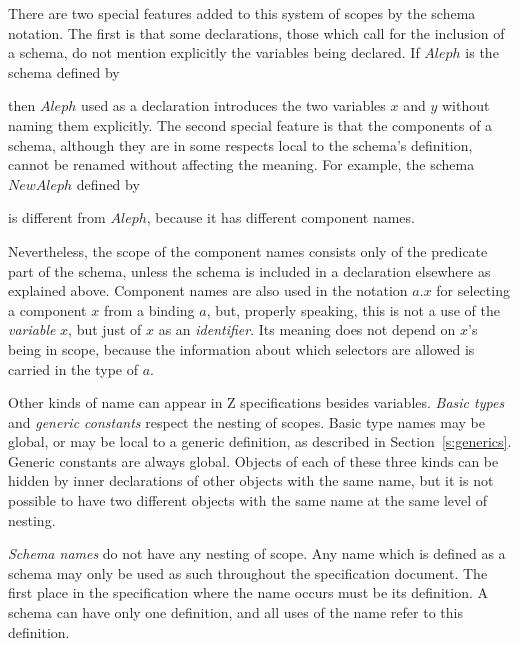 There are two special features added to this system of scopes by the
schema notation. The first is that some declarations, those which
call for the inclusion of a schema, do not mention explicitly the
variables being declared. If $Aleph$ is the schema defined by
then $Aleph$ used as a declaration introduces the two variables $x$
and $y$ without naming them explicitly.  The second special feature is
that the components of a schema, although they are in some respects
local to the schema's definition, cannot be renamed without affecting
the meaning. For example, the schema $NewAleph$ defined by
is different from $Aleph$, because it has different component names.

Nevertheless, the scope of the component names consists only of the
predicate part of the schema, unless the schema is included in a
declaration elsewhere as explained above. Component names are also
used in the notation $a.x$ for selecting
a component $x$ from a binding $a$, but, properly speaking, this is
not a use of the {\em variable\/} $x$, but just of $x$ as an {\em
identifier}. Its meaning does not depend on $x$'s being in scope,
because the information about which selectors are allowed is carried
in the type of $a$.

Other kinds of name can appear in Z specifications besides variables.
{\em Basic types\/} and {\em generic
constants\/} respect the
nesting of scopes. Basic type names may be global, or may be local
to a generic definition, as described in Section~\ref{s:generics}.
Generic constants are always global. Objects of each of these three
kinds can be hidden by inner declarations of other objects with the
same name, but it is not possible to have two different objects with
the same name at the same level of nesting.\label{p:multidec}

{\em Schema names\/} do not have any
nesting of scope. Any name which is defined as a schema may only be
used as such throughout the specification document. The first place in
the specification where the name occurs must be its definition. A
schema can have only one definition, and all uses of the name refer to
this definition.

